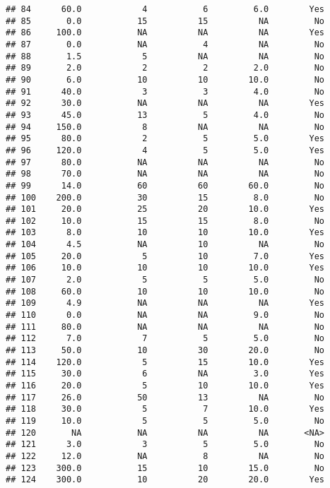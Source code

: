 \documentclass[
]{article}
\begin{document}
\begin{verbatim}
## 84      60.0            4           6         6.0        Yes
## 85       0.0           15          15          NA         No
## 86     100.0           NA          NA          NA        Yes
## 87       0.0           NA           4          NA         No
## 88       1.5            5          NA          NA         No
## 89       2.0            2           2         2.0         No
## 90       6.0           10          10        10.0         No
## 91      40.0            3           3         4.0         No
## 92      30.0           NA          NA          NA        Yes
## 93      45.0           13           5         4.0         No
## 94     150.0            8          NA          NA         No
## 95      80.0            2           5         5.0        Yes
## 96     120.0            4           5         5.0        Yes
## 97      80.0           NA          NA          NA         No
## 98      70.0           NA          NA          NA         No
## 99      14.0           60          60        60.0         No
## 100    200.0           30          15         8.0         No
## 101     20.0           25          20        10.0        Yes
## 102     10.0           15          15         8.0         No
## 103      8.0           10          10        10.0        Yes
## 104      4.5           NA          10          NA         No
## 105     20.0            5          10         7.0        Yes
## 106     10.0           10          10        10.0        Yes
## 107      2.0            5           5         5.0         No
## 108     60.0           10          10        10.0         No
## 109      4.9           NA          NA          NA        Yes
## 110      0.0           NA          NA         9.0         No
## 111     80.0           NA          NA          NA         No
## 112      7.0            7           5         5.0         No
## 113     50.0           10          30        20.0         No
## 114    120.0            5          15        10.0        Yes
## 115     30.0            6          NA         3.0        Yes
## 116     20.0            5          10        10.0        Yes
## 117     26.0           50          13          NA         No
## 118     30.0            5           7        10.0        Yes
## 119     10.0            5           5         5.0         No
## 120       NA           NA          NA          NA       <NA>
## 121      3.0            3           5         5.0         No
## 122     12.0           NA           8          NA         No
## 123    300.0           15          10        15.0         No
## 124    300.0           10          20        20.0        Yes

\end{verbatim}
\end{document}
